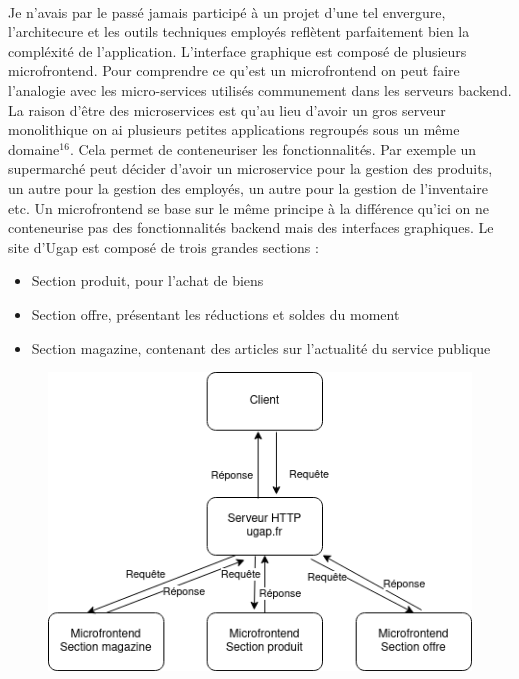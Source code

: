 \documentclass[12pt]{article}
\begin{document}
\begin {sloppypar}
\paragraph{}
Je n'avais par le passé jamais participé à un projet d'une tel envergure, l'architecure et les outils 
techniques employés reflètent parfaitement bien la compléxité de l'application. L'interface graphique 
est composé de plusieurs microfrontend. Pour comprendre ce qu'est un microfrontend on peut faire 
l'analogie avec les micro-services utilisés communement dans les serveurs backend. La raison d'être 
des microservices est qu'au lieu d'avoir un gros serveur monolithique on ai plusieurs petites applications 
regroupés sous un même domaine$^{16}$. Cela permet de conteneuriser les fonctionnalités. Par exemple 
un supermarché peut décider d'avoir un microservice pour la gestion des produits, un autre pour la 
gestion des employés, un autre pour la gestion de l'inventaire etc. Un microfrontend se base sur le même 
principe à la différence qu'ici on ne conteneurise pas des fonctionnalités backend mais des interfaces 
graphiques.
\newpage
Le site d'Ugap est composé de trois grandes sections : 
\begin{itemize}
  \item 
    Section produit, pour l'achat de biens
  \item 
    Section offre, présentant les réductions et soldes du moment
  \item 
    Section magazine, contenant des articles sur l'actualité du service publique
\end{itemize}
\begin{figure}[h]
  \includegraphics[width=\textwidth] {archi_ugap.png}

\end{figure}
\end{sloppypar}
\end{document}
